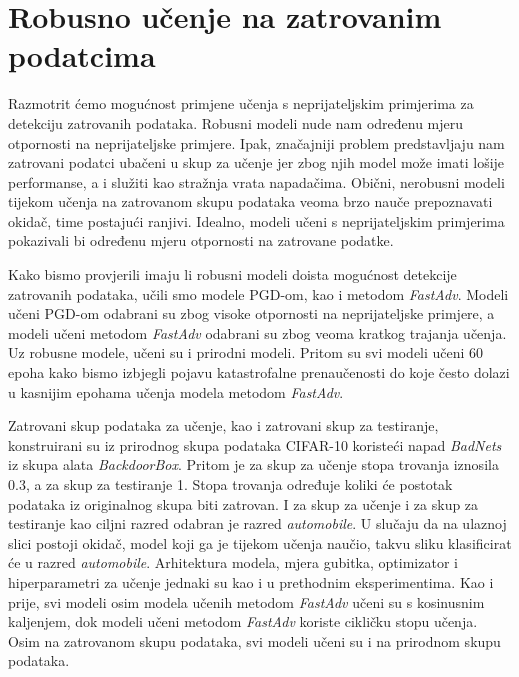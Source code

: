 \documentclass[times, utf8, zavrsni, numeric]{fer}
\begin{document}

\pagebreak

\section{Robusno učenje na zatrovanim podatcima}

Razmotrit ćemo mogućnost primjene učenja s neprijateljskim primjerima za detekciju zatrovanih podataka.
Robusni modeli nude nam određenu mjeru otpornosti na neprijateljske primjere. 
Ipak, značajniji problem predstavljaju nam zatrovani podatci ubačeni u skup za učenje jer zbog njih model može imati lošije performanse, a i služiti kao stražnja vrata napadačima.
Obični, nerobusni modeli tijekom učenja na zatrovanom skupu podataka veoma brzo nauče prepoznavati okidač, time postajući ranjivi.
Idealno, modeli učeni s neprijateljskim primjerima pokazivali bi određenu mjeru otpornosti na zatrovane podatke.

Kako bismo provjerili imaju li robusni modeli doista mogućnost detekcije zatrovanih podataka,
učili smo modele PGD-om, kao i metodom \textit{FastAdv}. Modeli učeni PGD-om odabrani su zbog visoke otpornosti na neprijateljske primjere,
a modeli učeni metodom \textit{FastAdv} odabrani su zbog veoma kratkog trajanja učenja. Uz robusne modele, učeni su i prirodni modeli.
Pritom su svi modeli učeni 60 epoha kako bismo izbjegli pojavu katastrofalne prenaučenosti do koje često dolazi u kasnijim epohama učenja modela metodom \textit{FastAdv}. 

Zatrovani skup podataka za učenje, kao i zatrovani skup za testiranje, konstruirani su iz prirodnog skupa podataka CIFAR-10 koristeći napad \textit{BadNets} iz skupa alata \textit{BackdoorBox}. 
Pritom je za skup za učenje stopa trovanja iznosila 0.3, a za skup za testiranje 1. Stopa trovanja određuje koliki će postotak podataka iz originalnog skupa biti zatrovan.
I za skup za učenje i za skup za testiranje kao ciljni razred odabran je razred \textit{automobile}. 
U slučaju da na ulaznoj slici postoji okidač, model koji ga je tijekom učenja naučio, takvu sliku klasificirat će u razred \textit{automobile}.
Arhitektura modela, mjera gubitka, optimizator i hiperparametri za učenje jednaki su kao i u prethodnim eksperimentima. 
Kao i prije, svi modeli osim modela učenih metodom \textit{FastAdv} učeni su s kosinusnim kaljenjem, dok modeli učeni metodom \textit{FastAdv} koriste cikličku stopu učenja.
Osim na zatrovanom skupu podataka, svi modeli učeni su i na prirodnom skupu podataka.
\end{document}

